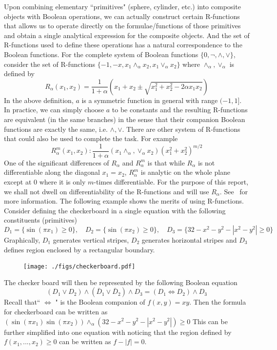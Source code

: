 \documentclass[11pt,reqno]{amsart}
\theoremstyle{definition}
\begin{document}
Upon combining elementary ``primitives" (sphere, cylinder, etc.) into composite objects with Boolean operations, we can actually construct certain R-functions that allows us to operate directly on the formulae/functions of those primitives and obtain a single analytical expression for the composite objects. And the set of R-functions used to define these operations has a natural correspondence to the Boolean functions. For the complete system of Boolean functions $\{0, \neg, \wedge, \vee\}$, consider the set of R-functions $\{-1,-x, x_1\wedge_\alpha x_2, x_1\vee_\alpha x_2\}$ where $\wedge_\alpha, \vee_\alpha$ is defined by
$$R_\alpha(x_1,x_2)=\frac{1}{1+\alpha} (x_1+x_2\pm \sqrt{x_1^2+x_2^2-2\alpha x_1x_2})$$
In the above definition, $a$ is a symmetric function in general with range $(-1,1]$. In practice, we can simply choose $a$ to be constants and the resulting R-functions are equivalent (in the same branches) in the sense that their companion Boolean functions are exactly the same, i.e. $\wedge,\vee$. There are other system of R-functions that could also be used to complete the task. For example
$$R_{\alpha}^m(x_1,x_2): \frac{1}{1+\alpha} (x_1 \wedge_\alpha ,\vee_\alpha x_2)(x_1^2+x_2^2)^{m/2}$$
One of the significant differences of $R_\alpha$ and $R_{\alpha}^{m}$ is that while $R_\alpha$ is not differentiable along the diagonal $x_1=x_2$, $R_{\alpha}^m$ is analytic on the whole plane except at $0$ where it is only $m$-times differentiable. For the purpose of this report, we shall not dwell on differentiability of the R-functions and will use $R_\alpha$. See~\cite{Shapiro} for more information.
The following example shows the merits of using R-functions. Consider defining the checkerboard in a single equation with the following constituents (primitives) 
$$D_1=\{\sin(\pi x_1)\geq 0\}, \quad D_2=\{\sin(\pi x_2)\geq 0\},\quad D_3=\{32-x^2-y^2-|x^2-y^2|\geq 0\}$$ 
Graphically, $D_1$ generates vertical stripes, $D_2$ generates horizontal stripes and $D_3$ defines region enclosed by a rectangular boundary. 
\begin{figure}[H]
\texttt{[image: ./figs/checkerboard.pdf]}
\end{figure}

The checker board will then be represented by the following Boolean equation
$$(D_1\vee D_2)\wedge (\bar{D}_1\vee \bar{D}_2)\wedge D_3=(D_1\Leftrightarrow D_2)\wedge D_3$$
Recall that`` $\Leftrightarrow$ " is the Boolean companion of $f(x,y)=xy$. Then the formula for checkerboard can be written as 
$(\sin(\pi x_1)\sin(\pi x_2)) \wedge_\alpha (32-x^2-y^2-|x^2-y^2|) \geq 0$
This can be further simplified into one equation with noticing that the region defined by $f(x_1,...,x_2)\geq 0$ can be written as $f-|f|= 0$.  
\end{document}
